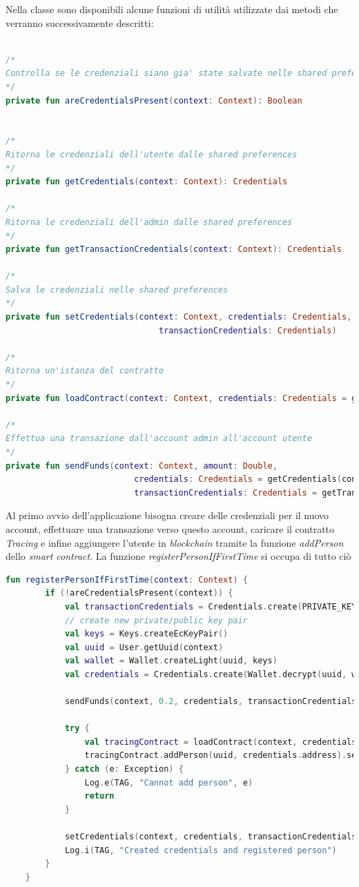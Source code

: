 \newpage
Nella classe sono disponibili alcune funzioni di utilità utilizzate dai metodi che verranno successivamente descritti:
\begin{lstlisting}[language = Kotlin]

/*
Controlla se le credenziali siano gia' state salvate nelle shared preferences
*/
private fun areCredentialsPresent(context: Context): Boolean


/*
Ritorna le credenziali dell'utente dalle shared preferences
*/
private fun getCredentials(context: Context): Credentials

/*
Ritorna le credenziali dell'admin dalle shared preferences
*/
private fun getTransactionCredentials(context: Context): Credentials

/*
Salva le credenziali nelle shared preferences
*/
private fun setCredentials(context: Context, credentials: Credentials,
                               transactionCredentials: Credentials)

/*
Ritorna un'istanza del contratto
*/
private fun loadContract(context: Context, credentials: Credentials = getCredentials(context)): TracingContract

/*
Effettua una transazione dall'account admin all'account utente
*/
private fun sendFunds(context: Context, amount: Double,
                          credentials: Credentials = getCredentials(context),
                          transactionCredentials: Credentials = getTransactionCredentials(context))
\end{lstlisting} 

\newpage
Al primo avvio dell'applicazione bisogna creare delle credenziali per il nuovo account, effettuare una transazione verso questo account, caricare il contratto \textit{Tracing} e infine aggiungere l'utente in \textit{blockchain} tramite la funzione \textit{addPerson} dello \textit{smart contract}. La funzione \textit{registerPersonIfFirstTime} si occupa di tutto ciò
\begin{lstlisting}[language = Kotlin]
    fun registerPersonIfFirstTime(context: Context) {
        if (!areCredentialsPresent(context)) {
            val transactionCredentials = Credentials.create(PRIVATE_KEY)
            // create new private/public key pair
            val keys = Keys.createEcKeyPair()
            val uuid = User.getUuid(context)
            val wallet = Wallet.createLight(uuid, keys)
            val credentials = Credentials.create(Wallet.decrypt(uuid, wallet))

            sendFunds(context, 0.2, credentials, transactionCredentials)

            try {
                val tracingContract = loadContract(context, credentials)
                tracingContract.addPerson(uuid, credentials.address).sendAsync().get()
            } catch (e: Exception) {
                Log.e(TAG, "Cannot add person", e)
                return
            }

            setCredentials(context, credentials, transactionCredentials)
            Log.i(TAG, "Created credentials and registered person")
        }
    }
\end{lstlisting}


